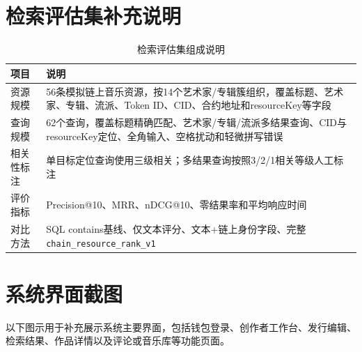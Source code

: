 \section{检索评估集补充说明}

\begin{table}[htbp]
    \linespread{1.45}
    \songti
    \centering
    \caption{检索评估集组成说明}\label{tab:appendix_ranking_dataset}
    \begin{tabular}{|l|p{8.8cm}|}
        \hline
        项目 & 说明 \\ \hline
        资源规模 & 56条模拟链上音乐资源，按14个艺术家/专辑簇组织，覆盖标题、艺术家、专辑、流派、Token ID、CID、合约地址和resourceKey等字段 \\ \hline
        查询规模 & 62个查询，覆盖标题精确匹配、艺术家/专辑/流派多结果查询、CID与resourceKey定位、全角输入、空格扰动和轻微拼写错误 \\ \hline
        相关性标注 & 单目标定位查询使用三级相关；多结果查询按照3/2/1相关等级人工标注 \\ \hline
        评价指标 & Precision@10、MRR、nDCG@10、零结果率和平均响应时间 \\ \hline
        对比方法 & SQL contains基线、仅文本评分、文本+链上身份字段、完整\texttt{chain\_resource\_rank\_v1} \\ \hline
    \end{tabular}
\end{table}


\section{系统界面截图}

以下图示用于补充展示系统主要界面，包括钱包登录、创作者工作台、发行编辑、检索结果、作品详情以及评论或音乐库等功能页面。









